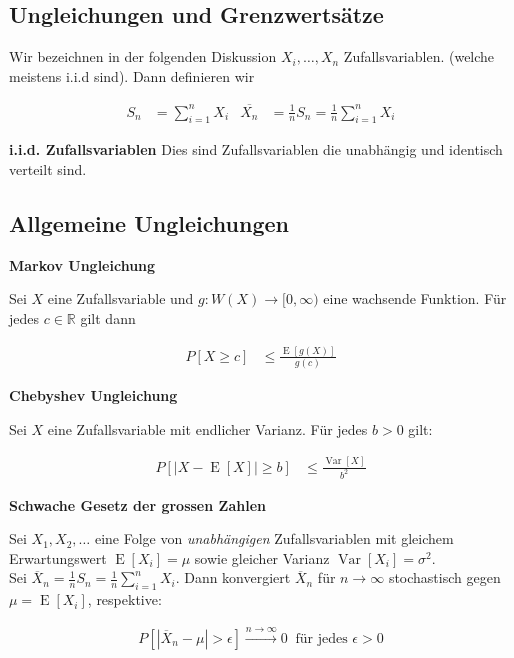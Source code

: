 \documentclass[25pt]{sciposter}
\newcommand{\R}{\mathbb{R}}
\newcommand{\Var}{\operatorname{Var}}
\newcommand{\E}{\operatorname{E}}
\newenvironment{method}[1]{\begin{mdframed}[backgroundcolor=blue!10,innertopmargin=15pt, innerbottommargin=15pt,nobreak=true]
		\textbf{#1 }
	}
	{ 
	\end{mdframed}
}
\begin{document}
\begin{multicols}{3}
\section{Ungleichungen und Grenzwertsätze}

Wir bezeichnen in der folgenden Diskussion $X_i, \ldots, X_n$ Zufallsvariablen. (welche meistens i.i.d sind). Dann definieren wir

\begin{align*}
	S_n &= \sum_{i=1}^{n} X_i & \overline{X_n} &= \frac{1}{n}S_n = \frac{1}{n}\sum_{i=1}^{n}X_i
\end{align*}

\textbf{i.i.d. Zufallsvariablen} Dies sind Zufallsvariablen die unabhängig und identisch verteilt sind. 

\subsection*{Allgemeine Ungleichungen}

\begin{method}{Markov Ungleichung}
	Sei $X$ eine Zufallsvariable und $g:W(X)\to [0,\infty)$ eine wachsende Funktion. Für jedes $c\in\R$ gilt dann 
	
	\begin{align*}
		P[X \geq c] &\leq \frac{\E[g(X)]}{g(c)}
	\end{align*}
\end{method}


\begin{method}{Chebyshev Ungleichung}
	Sei $X$ eine Zufallsvariable mit endlicher Varianz. Für jedes $b>0$ gilt:
	
	\begin{align*}
		P[|X-\E[X]| \geq b] &\leq \frac{\Var[X]}{b^2}
	\end{align*}
\end{method}


\begin{method}{Schwache Gesetz der grossen Zahlen}
	Sei $X_1,X_2,\ldots$ eine Folge von \textit{unabhängigen} Zufallsvariablen mit gleichem Erwartungswert $\E[X_i] = \mu$ sowie gleicher Varianz $\Var[X_i] = \sigma^2$.\\
	
	
	Sei $\overline{X}_n = \frac{1}{n}S_n = \frac{1}{n} \sum_{i=1}^{n} X_i$. Dann konvergiert $\overline{X}_n$ für $n\to\infty $ stochastisch gegen $\mu = \E[X_i]$, respektive:
	
	\begin{align*}
		P[|\overline{X}_n - \mu|> \epsilon] \stackrel{n\to\infty}{\longrightarrow}   0 \ \text{ für jedes }\epsilon > 0
	\end{align*}
	

\end{method}
\end{multicols}
\end{document}
